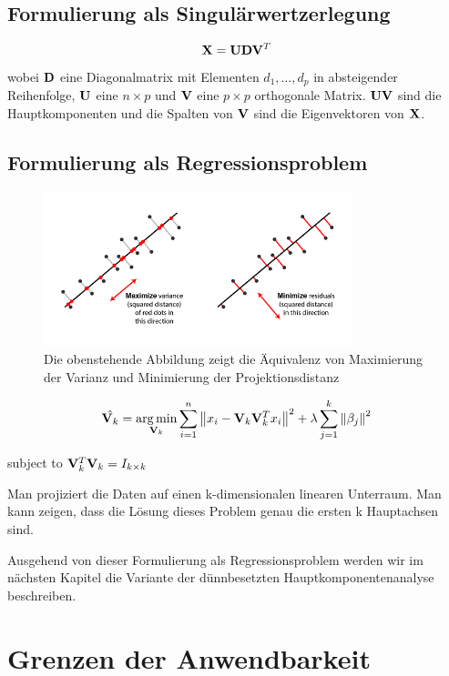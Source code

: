 \subsection{Formulierung als Singulärwertzerlegung}
$$ \mathbf{X} = \mathbf{U}\mathbf{D}\mathbf{V}^T $$
wobei $\mathbf{D}$ eine Diagonalmatrix mit Elementen $d_1,\ldots,d_p$ in absteigender Reihenfolge, $\mathbf{U}$ eine $n \times p$ und $\mathbf{V}$ eine $p \times p$ orthogonale Matrix.
$\mathbf{U}\mathbf{V}$ sind die Hauptkomponenten und die Spalten von $\mathbf{V}$ sind die Eigenvektoren von $\mathbf{X}$.

\subsection{Formulierung als Regressionsproblem}

\begin{figure}
\centering
\includegraphics[width = 0.8\textwidth]{figures/pca_projection_explanation.png}
\caption{Die obenstehende Abbildung zeigt die Äquivalenz von Maximierung der Varianz und Minimierung der Projektionsdistanz}
\label{pca_projection_explanation}
\end{figure}

$$\hat{\mathbf{V}_k} = \operatorname*{arg\,min}_{\mathbf{V}_k} \sum_{i=1}^{n} \left\lVert x_i - \mathbf{V}_k \mathbf{V}_k^Tx_i \right\rVert^2 + \lambda \sum_{j=1}^{k}\left\lVert \beta_j \right\rVert^2$$

subject to $\mathbf{V}_k^T\mathbf{V}_k = I_{k \times k}$

\cite{zou_sparsepca}

Man projiziert die Daten auf einen k-dimensionalen linearen Unterraum. Man kann zeigen, dass die Lösung dieses Problem genau die ersten k Hauptachsen sind.

Ausgehend von dieser Formulierung als Regressionsproblem werden wir im nächsten Kapitel die Variante der dünnbesetzten Hauptkomponentenanalyse beschreiben.

\section{Grenzen der Anwendbarkeit}

